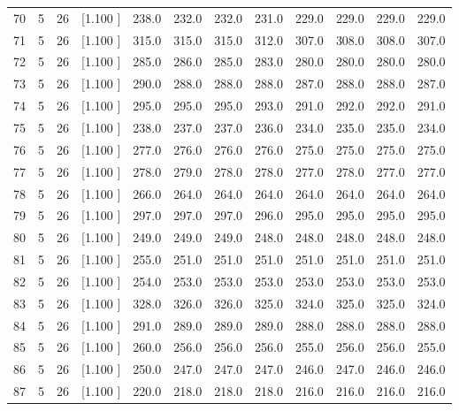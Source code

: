 \documentclass[12pt,a4paper]{article}
\begin{document}
\begin{center}
{\begin{tabular}{r r r r r r r r r r r r}
  70&  5& 26&[1.100     ]&   238.0&   232.0&   232.0&   231.0&   229.0&   229.0&   229.0&   229.0\\[-0.02in]
  71&  5& 26&[1.100     ]&   315.0&   315.0&   315.0&   312.0&   307.0&   308.0&   308.0&   307.0\\[-0.02in]
  72&  5& 26&[1.100     ]&   285.0&   286.0&   285.0&   283.0&   280.0&   280.0&   280.0&   280.0\\[-0.02in]
  73&  5& 26&[1.100     ]&   290.0&   288.0&   288.0&   288.0&   287.0&   288.0&   288.0&   287.0\\[-0.02in]
  74&  5& 26&[1.100     ]&   295.0&   295.0&   295.0&   293.0&   291.0&   292.0&   292.0&   291.0\\[-0.02in]
  75&  5& 26&[1.100     ]&   238.0&   237.0&   237.0&   236.0&   234.0&   235.0&   235.0&   234.0\\[-0.02in]
  76&  5& 26&[1.100     ]&   277.0&   276.0&   276.0&   276.0&   275.0&   275.0&   275.0&   275.0\\[-0.02in]
  77&  5& 26&[1.100     ]&   278.0&   279.0&   278.0&   278.0&   277.0&   278.0&   277.0&   277.0\\[-0.02in]
  78&  5& 26&[1.100     ]&   266.0&   264.0&   264.0&   264.0&   264.0&   264.0&   264.0&   264.0\\[-0.02in]
  79&  5& 26&[1.100     ]&   297.0&   297.0&   297.0&   296.0&   295.0&   295.0&   295.0&   295.0\\[-0.02in]
  80&  5& 26&[1.100     ]&   249.0&   249.0&   249.0&   248.0&   248.0&   248.0&   248.0&   248.0\\[-0.02in]
  81&  5& 26&[1.100     ]&   255.0&   251.0&   251.0&   251.0&   251.0&   251.0&   251.0&   251.0\\[-0.02in]
  82&  5& 26&[1.100     ]&   254.0&   253.0&   253.0&   253.0&   253.0&   253.0&   253.0&   253.0\\[-0.02in]
  83&  5& 26&[1.100     ]&   328.0&   326.0&   326.0&   325.0&   324.0&   325.0&   325.0&   324.0\\[-0.02in]
  84&  5& 26&[1.100     ]&   291.0&   289.0&   289.0&   289.0&   288.0&   288.0&   288.0&   288.0\\[-0.02in]
  85&  5& 26&[1.100     ]&   260.0&   256.0&   256.0&   256.0&   255.0&   256.0&   256.0&   255.0\\[-0.02in]
  86&  5& 26&[1.100     ]&   250.0&   247.0&   247.0&   247.0&   246.0&   247.0&   246.0&   246.0\\[-0.02in]
  87&  5& 26&[1.100     ]&   220.0&   218.0&   218.0&   218.0&   216.0&   216.0&   216.0&   216.0\\[-0.02in]

\end{tabular}}
\end{center}
\end{document}
